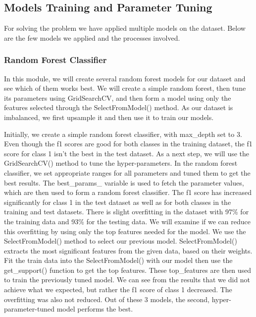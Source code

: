 \documentclass[12pt]{article}
\begin{document}
\subsection{Models Training and Parameter Tuning}

For solving the problem we have applied multiple models on the dataset.
Below are the few models we applied and the processes involved.

\subsubsection{Random Forest Classifier}

In this module, we will create several random forest models for our dataset and see which of them works best. We will create a simple random forest, then tune its parameters using GridSearchCV, and then form a model using only the features selected through the SelectFromModel() method. As our dataset is imbalanced, we first upsample it and then use it to train our models.

Initially, we create a simple random forest classifier, with max\_depth set to 3. Even though the f1 scores are good for both classes in the training dataset, the f1 score for class 1 isn't the best in the test dataset. As a next step, we will use the GridSearchCV() method to tune the hyper-parameters. In the random forest classifier, we set appropriate ranges for all parameters and tuned them to get the best results. The best\_params\_ variable is used to fetch the parameter values, which are then used to form a random forest classifier. The f1 score has increased significantly for class 1 in the test dataset as well as for both classes in the training and test datasets. There is slight overfitting in the dataset with 97\% for the training data and 93\% for the testing data. We will examine if we can reduce this overfitting by using only the top features needed for the model. We use the SelectFromModel() method to select our previous model. SelectFromModel() extracts the most significant features from the given data, based on their weights. Fit the train data into the SelectFromModel() with our model then use the get\_support() function to get the top features. These top\_features are then used to train the previously tuned model. We can see from the results that we did not achieve what we expected, but rather the f1 score of class 1 decreased. The overfitting was also not reduced. Out of these 3 models, the second, hyper-parameter-tuned model performs the best.
\end{document}
